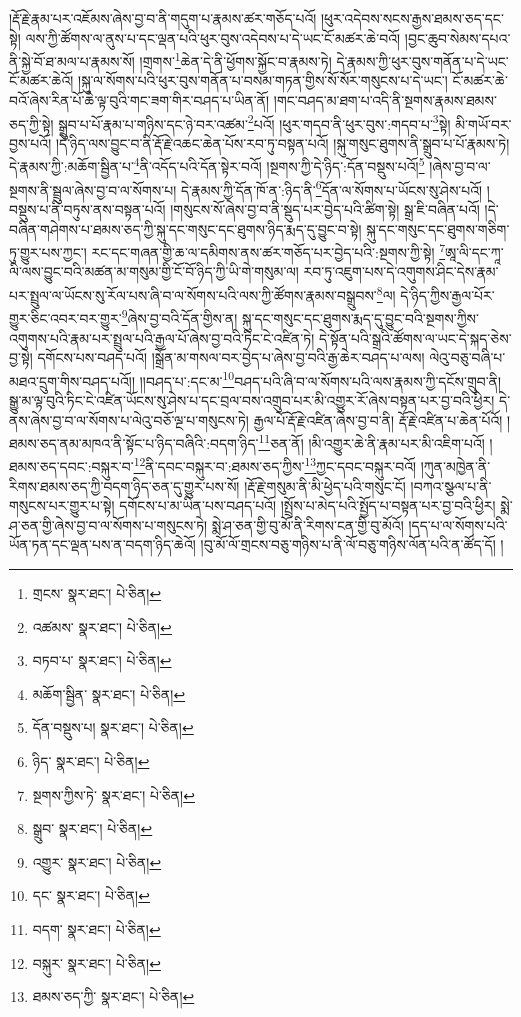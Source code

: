 །རྡོ་རྗེ་རྣམ་པར་འཇོམས་ཞེས་བྱ་བ་ནི་གདུག་པ་རྣམས་ཚར་གཅོད་པའོ། །ཕུར་འདེབས་སངས་རྒྱས་ཐམས་ཅད་དང་སྟེ། ལས་ཀྱི་ཚོགས་ལ་ནུས་པ་དང་ལྡན་པའི་ཕུར་བུས་འདེབས་པ་དེ་ཡང་ངོ་མཚར་ཆེ་བའོ། །བྱང་ཆུབ་སེམས་དཔའ་ནི་སྐྱེ་བོ་ཐ་མལ་པ་རྣམས་སོ། །གྲགས་\footnote{གྲངས་  སྣར་ཐང་།  པེ་ཅིན། }ཆེན་དེ་ནི་ཕྱོགས་སྐྱོང་བ་རྣམས་ཏེ། དེ་རྣམས་ཀྱི་ཕུར་བུས་གནོན་པ་དེ་ཡང་ངོ་མཚར་ཆེའོ། །སྐུ་ལ་སོགས་པའི་ཕུར་བུས་གནོན་པ་བསམ་གཏན་གྱིས་སོ་སོར་གསུངས་པ་དེ་ཡང་། ངོ་མཚར་ཆེ་བའོ་ཞེས་རིན་པོ་ཆེ་ལྟ་བུའི་གང་ཟག་གིར་བཤད་པ་ཡིན་ནོ། །གང་བཤད་མ་ཐག་པ་འདི་ནི་སྔགས་རྣམས་ཐམས་ཅད་ཀྱི་སྟེ། སྒྲུབ་པ་པོ་རྣམ་པ་གཉིས་དང་ཉེ་བར་འཚམ་\footnote{འཚམས་  སྣར་ཐང་།  པེ་ཅིན། }པའོ། །ཕུར་གདབ་ནི་ཕུར་བུས་:གདབ་པ་\footnote{བཏབ་པ་  སྣར་ཐང་།  པེ་ཅིན། }སྟེ། མི་གཡོ་བར་བྱས་པའོ། །དེ་ཉིད་ལས་བྱུང་བ་ནི་རྡོ་རྗེ་འཆང་ཆེན་པོས་རབ་ཏུ་བསྟན་པའོ། །སྐུ་གསུང་ཐུགས་ནི་སྒྲུབ་པ་པོ་རྣམས་ཏེ། དེ་རྣམས་ཀྱི་:མཆོག་སྦྱིན་པ་\footnote{མཆོག་སྦྱིན་  སྣར་ཐང་།  པེ་ཅིན། }ནི་འདོད་པའི་དོན་སྟེར་བའོ། །སྔགས་ཀྱི་དེ་ཉིད་:དོན་བསྡུས་པའོ།\footnote{དོན་བསྡུས་པ།  སྣར་ཐང་།  པེ་ཅིན། } །ཞེས་བྱ་བ་ལ་སྔགས་ནི་སྦྲུལ་ཞེས་བྱ་བ་ལ་སོགས་པ། དེ་རྣམས་ཀྱི་དོན་ཁོ་ན་:ཉིད་ནི་\footnote{ཉིད་  སྣར་ཐང་།  པེ་ཅིན། }དོན་ལ་སོགས་པ་ཡོངས་སུ་ཤེས་པའོ། །བསྡུས་པ་ནི་བཏུས་ནས་བསྟན་པའོ། །གསུངས་སོ་ཞེས་བྱ་བ་ནི་སྡུད་པར་བྱེད་པའི་ཚིག་སྟེ། སྒྲ་ཇི་བཞིན་པའོ། །དེ་བཞིན་གཤེགས་པ་ཐམས་ཅད་ཀྱི་སྐུ་དང་གསུང་དང་ཐུགས་ཉིད་རྨད་དུ་བྱུང་བ་སྟེ། སྐུ་དང་གསུང་དང་ཐུགས་གཅིག་ཏུ་གྱུར་པས་ཀྱང་། རང་དང་གཞན་གྱི་ཆ་ལ་དམིགས་ནས་ཚར་གཅོད་པར་བྱེད་པའི་:སྔགས་ཀྱི་སྟེ། \footnote{སྔགས་ཀྱིས་ཏེ་  སྣར་ཐང་།  པེ་ཅིན། }ཨཱ་ལི་དང་ཀཱ་ལི་ལས་བྱུང་བའི་མཚན་མ་གསུམ་གྱི་ངོ་བོ་ཉིད་ཀྱི་ཡི་གེ་གསུམ་ལ། རབ་ཏུ་འཇུག་པས་དེ་འགུགས་ཤིང་དེས་རྣམ་པར་སྤྲུལ་ལ་ཡོངས་སུ་རོལ་པས་ཞི་བ་ལ་སོགས་པའི་ལས་ཀྱི་ཚོགས་རྣམས་བསྒྲུབས་\footnote{སྒྲུབ་  སྣར་ཐང་།  པེ་ཅིན། }ལ། དེ་ཉིད་ཀྱིས་རྒྱལ་པོར་གྱུར་ཅིང་འབར་བར་གྱུར་\footnote{འགྱུར་  སྣར་ཐང་།  པེ་ཅིན། }ཞེས་བྱ་བའི་དོན་གྱིས་ན། སྐུ་དང་གསུང་དང་ཐུགས་རྨད་དུ་བྱུང་བའི་སྔགས་ཀྱིས་འགུགས་པའི་རྣམ་པར་སྤྲུལ་པའི་རྒྱལ་པོ་ཞེས་བྱ་བའི་ཏིང་ངེ་འཛིན་ཏེ། དེ་སྟོན་པའི་སྒྲའི་ཚོགས་ལ་ཡང་དེ་སྐད་ཅེས་བྱ་སྟེ། དགོངས་པས་བཤད་པའོ། །སྒྲོན་མ་གསལ་བར་བྱེད་པ་ཞེས་བྱ་བའི་རྒྱ་ཆེར་བཤད་པ་ལས། ལེའུ་བཅུ་བཞི་པ་མཐའ་དྲུག་གིས་བཤད་པའོ།། །།བཤད་པ་:དང་མ་\footnote{དང་  སྣར་ཐང་།  པེ་ཅིན། }བཤད་པའི་ཞི་བ་ལ་སོགས་པའི་ལས་རྣམས་ཀྱི་དངོས་གྲུབ་ནི། སྒྱུ་མ་ལྟ་བུའི་ཏིང་ངེ་འཛིན་ཡོངས་སུ་ཤེས་པ་དང་བྲལ་བས་འགྲུབ་པར་མི་འགྱུར་རོ་ཞེས་བསྟན་པར་བྱ་བའི་ཕྱིར། དེ་ནས་ཞེས་བྱ་བ་ལ་སོགས་པ་ལེའུ་བཅོ་ལྔ་པ་གསུངས་ཏེ། རྒྱལ་པོ་རྡོ་རྗེ་འཛིན་ཞེས་བྱ་བ་ནི། རྡོ་རྗེ་འཛིན་པ་ཆེན་པོའོ། །ཐམས་ཅད་ནམ་མཁའ་ནི་སྟོང་པ་ཉིད་བཞིའི་:བདག་ཉིད་\footnote{བདག་  སྣར་ཐང་།  པེ་ཅིན། }ཅན་ནོ། །མི་འགྱུར་ཆེ་ནི་རྣམ་པར་མི་འཇིག་པའོ། །ཐམས་ཅད་དབང་:བསྐུར་བ་\footnote{བསྐུར་  སྣར་ཐང་།  པེ་ཅིན། }ནི་དབང་བསྐུར་བ་:ཐམས་ཅད་ཀྱིས་\footnote{ཐམས་ཅད་ཀྱི་  སྣར་ཐང་།  པེ་ཅིན། }ཀྱང་དབང་བསྐུར་བའོ། །ཀུན་མཁྱེན་ནི་རིགས་ཐམས་ཅད་ཀྱི་བདག་ཉིད་ཅན་དུ་གྱུར་པས་སོ། །རྡོ་རྗེ་གསུམ་ནི་མི་ཕྱེད་པའི་གསུང་ངོ། །བཀའ་སྩལ་པ་ནི་གསུངས་པར་གྱུར་པ་སྟེ། དགོངས་པ་མ་ཡིན་པས་བཤད་པའོ། །སྤྲོས་པ་མེད་པའི་སྤྱོད་པ་བསྟན་པར་བྱ་བའི་ཕྱིར། སྨེ་ཤ་ཅན་གྱི་ཞེས་བྱ་བ་ལ་སོགས་པ་གསུངས་ཏེ། སྨེ་ཤ་ཅན་གྱི་བུ་མོ་ནི་རིགས་ངན་གྱི་བུ་མོའོ། །དད་པ་ལ་སོགས་པའི་ཡོན་ཏན་དང་ལྡན་པས་ན་བདག་ཉིད་ཆེའོ། །བུ་མོ་ལོ་གྲངས་བཅུ་གཉིས་པ་ནི་ལོ་བཅུ་གཉིས་ལོན་པའི་ན་ཚོད་དོ། །
